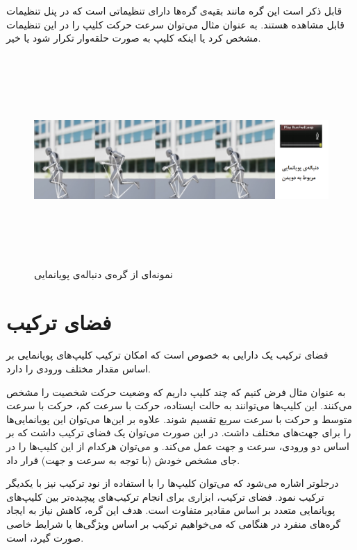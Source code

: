 قابل ذکر است این گره‌ مانند بقیه‌ی گره‌ها دارای تنظیماتی است که در پنل تنظیمات قابل مشاهده‌ هستند. به عنوان مثال 
می‌توان سرعت حرکت کلیپ را در این تنظیمات مشخص کرد یا اینکه کلیپ به صورت حلقه‌وار تکرار شود یا خیر.

\begin{figure}[ht]
	\centerline{\includegraphics[width=\textwidth,height=8cm,keepaspectratio]{Figures/Ch3/AnimationSequence.png}}

	\caption{نمونه‌ای از گره‌ی دنباله‌ی پویانمایی}
	\label{fig:AnimationSequence}
\end{figure}



\section {فضای ترکیب}

فضای ترکیب یک دارایی به خصوص است که 
امکان ترکیب کلیپ‌های پویانمایی بر اساس مقدار مختلف ورودی را دارد.

به عنوان مثال فرض کنیم که چند کلیپ داریم که 
وضعیت حرکت شخصیت را مشخص می‌کنند.
این کلیپ‌ها می‌توانند به 
حالت ایستاده، حرکت با سرعت کم، حرکت با سرعت متوسط 
و حرکت با سرعت سریع تقسیم شوند.
علاوه‌ بر این‌ها می‌توان این پویانمایی‌ها را برای جهت‌های مختلف داشت.
در این صورت می‌توان یک فضای ترکیب داشت که بر اساس 
دو ورودی، سرعت و جهت عمل می‌کند.
و می‌توان هرکدام از این کلیپ‌ها را در جای مشخص خودش 
(با توجه به سرعت و جهت)
قرار داد.

درجلوتر اشاره می‌شود که می‌توان کلیپ‌ها را با استفاده از 
نود ترکیب نیز با یکدیگر ترکیب نمود. 
فضای ترکیب، ابزاری برای انجام ترکیب‌های پیچیده‌تر 
بین کلیپ‌های پویانمایی متعدد بر اساس 
مقادیر متفاوت است.
هدف این گره، کاهش نیاز به ایجاد گره‌های منفرد
در هنگامی که می‌خواهیم ترکیب بر اساس ویژگی‌ها یا شرایط خاصی 
صورت گیرد، است.


